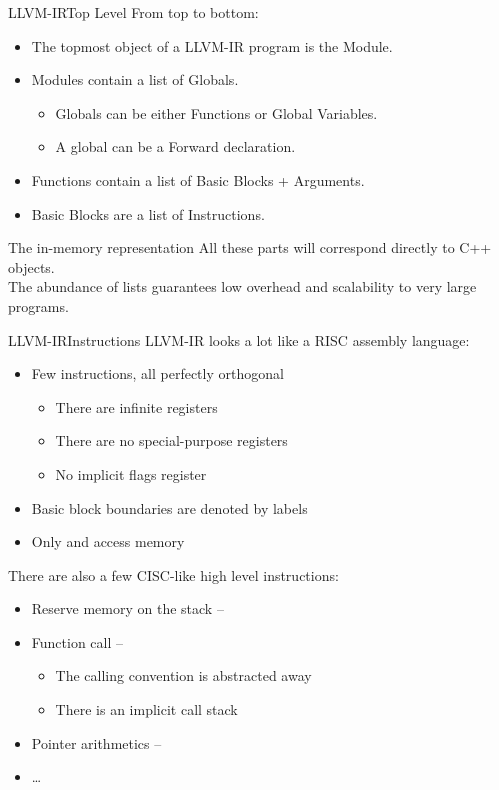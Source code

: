 \begin{frame}{LLVM-IR}{Top Level}
From top to bottom:
\begin{itemize}
\item The topmost object of a LLVM-IR program is the \alert{Module}.
\item \alert{Modules} contain a list of \alert{Globals}.
	\begin{itemize}
	\item {Globals} can be either \alert{Functions} or \alert{Global Variables}.
	\item A global can be a \alert{Forward declaration}.
	\end{itemize}
\item \alert{Functions} contain a list of \alert{Basic Blocks} + \alert{Arguments}.
\item \alert{Basic Blocks} are a list of \alert{Instructions}.
\end{itemize}
\begin{block}{The in-memory representation}
All these parts will correspond directly to \alert{C++ objects}.\\
The abundance of lists guarantees low overhead and scalability to very large programs.
\end{block}
\end{frame}


\begin{frame}{LLVM-IR}{Instructions}
LLVM-IR looks a lot like a RISC assembly language:\\

\begin{itemize}
\item Few instructions, all perfectly orthogonal
	\begin{itemize}
	\item There are infinite registers
	\item There are no special-purpose registers
	\item No implicit flags register
	\end{itemize}
\item Basic block boundaries are denoted by \alert{labels}
\item Only  and  access memory
\end{itemize}

\vfill
There are also a few CISC-like \alert{high level instructions}:

\begin{itemize}
\item Reserve memory on the stack -- 
\item Function call -- 
	\begin{itemize}
	\item The calling convention is abstracted away
	\item There is an implicit call stack
	\end{itemize}
\item Pointer arithmetics -- 
\item \ldots
\end{itemize}
\end{frame}



